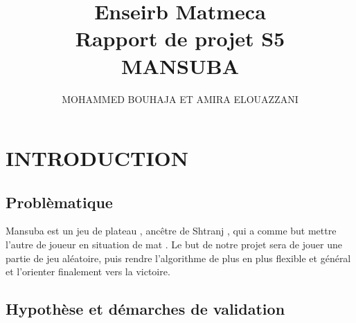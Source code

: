 \documentclass[a4paper]{article}
\begin{document}

\title{ Enseirb Matmeca \\ Rapport de projet S5 \\ MANSUBA }
\author{MOHAMMED BOUHAJA ET AMIRA ELOUAZZANI}
\maketitle





\newpage

\tableofcontents

\newpage

\begin{center}
\end{center}

\section{INTRODUCTION}
\subsection{Problèmatique}
Mansuba est un jeu de plateau , ancêtre de Shtranj , qui a comme but mettre l’autre de joueur en situation de mat . 
Le but de notre projet sera de jouer une partie de jeu aléatoire, puis rendre l'algorithme de plus en plus flexible et général
et l'orienter finalement vers la victoire. 
\subsection{Hypothèse et démarches de validation}
\end{document}
